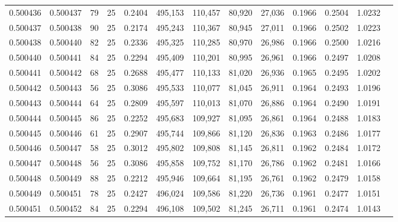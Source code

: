 \begin{tabular}{rrrrrrrrrrrrr}
0.500436 & 0.500437 &  79 &  25 &                                     0.2404 & 495,153 & 110,457 &  80,920 &  27,036 & 0.1966 & 0.2504 & 1.0232 \\
0.500437 & 0.500438 &  90 &  25 &                                     0.2174 & 495,243 & 110,367 &  80,945 &  27,011 & 0.1966 & 0.2502 & 1.0223 \\
0.500438 & 0.500440 &  82 &  25 &                                     0.2336 & 495,325 & 110,285 &  80,970 &  26,986 & 0.1966 & 0.2500 & 1.0216 \\
0.500440 & 0.500441 &  84 &  25 &                                     0.2294 & 495,409 & 110,201 &  80,995 &  26,961 & 0.1966 & 0.2497 & 1.0208 \\
0.500441 & 0.500442 &  68 &  25 &                                     0.2688 & 495,477 & 110,133 &  81,020 &  26,936 & 0.1965 & 0.2495 & 1.0202 \\
0.500442 & 0.500443 &  56 &  25 &                                     0.3086 & 495,533 & 110,077 &  81,045 &  26,911 & 0.1964 & 0.2493 & 1.0196 \\
0.500443 & 0.500444 &  64 &  25 &                                     0.2809 & 495,597 & 110,013 &  81,070 &  26,886 & 0.1964 & 0.2490 & 1.0191 \\
0.500444 & 0.500445 &  86 &  25 &                                     0.2252 & 495,683 & 109,927 &  81,095 &  26,861 & 0.1964 & 0.2488 & 1.0183 \\
0.500445 & 0.500446 &  61 &  25 &                                     0.2907 & 495,744 & 109,866 &  81,120 &  26,836 & 0.1963 & 0.2486 & 1.0177 \\
0.500446 & 0.500447 &  58 &  25 &                                     0.3012 & 495,802 & 109,808 &  81,145 &  26,811 & 0.1962 & 0.2484 & 1.0172 \\
0.500447 & 0.500448 &  56 &  25 &                                     0.3086 & 495,858 & 109,752 &  81,170 &  26,786 & 0.1962 & 0.2481 & 1.0166 \\
0.500448 & 0.500449 &  88 &  25 &                                     0.2212 & 495,946 & 109,664 &  81,195 &  26,761 & 0.1962 & 0.2479 & 1.0158 \\
0.500449 & 0.500451 &  78 &  25 &                                     0.2427 & 496,024 & 109,586 &  81,220 &  26,736 & 0.1961 & 0.2477 & 1.0151 \\
0.500451 & 0.500452 &  84 &  25 &                                     0.2294 & 496,108 & 109,502 &  81,245 &  26,711 & 0.1961 & 0.2474 & 1.0143 \\

\end{tabular}
